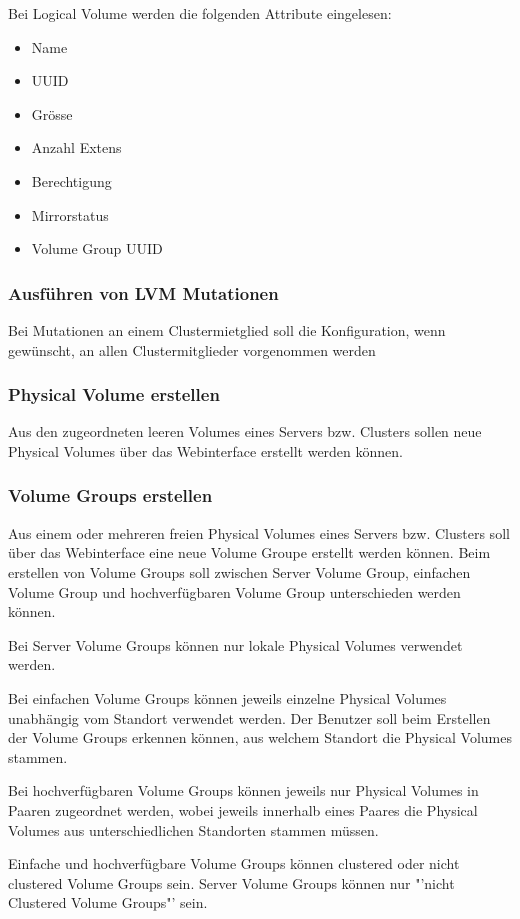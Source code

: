 Bei Logical Volume werden die folgenden Attribute eingelesen:
\begin{itemize}
\item Name
\item UUID
\item Grösse
\item Anzahl Extens
\item Berechtigung
\item Mirrorstatus
\item Volume Group UUID\newline
\end{itemize}

\subsubsection{Ausführen von LVM Mutationen}
Bei Mutationen an einem Clustermietglied soll die Konfiguration, wenn gewünscht, an allen Clustermitglieder vorgenommen werden

\subsubsection{Physical Volume erstellen}
Aus den zugeordneten leeren Volumes eines Servers bzw. Clusters sollen neue Physical Volumes über das Webinterface erstellt werden können.

\subsubsection{Volume Groups erstellen}
Aus einem oder mehreren freien Physical Volumes eines Servers bzw. Clusters soll über das Webinterface eine neue Volume Groupe erstellt werden können. Beim erstellen von Volume Groups soll zwischen Server Volume Group, einfachen Volume Group und hochverfügbaren Volume Group unterschieden werden können.

Bei Server Volume Groups können nur lokale Physical Volumes verwendet werden.

Bei einfachen Volume Groups können jeweils einzelne Physical Volumes unabhängig vom Standort verwendet werden. Der Benutzer soll beim Erstellen der Volume Groups erkennen können, aus welchem Standort die Physical Volumes stammen.

Bei hochverfügbaren Volume Groups können jeweils nur Physical Volumes in Paaren zugeordnet werden, wobei jeweils innerhalb eines Paares die Physical Volumes aus unterschiedlichen Standorten stammen müssen.

Einfache und hochverfügbare Volume Groups können clustered oder nicht clustered Volume Groups sein. 
Server Volume Groups können nur "'nicht Clustered Volume Groups"' sein.

